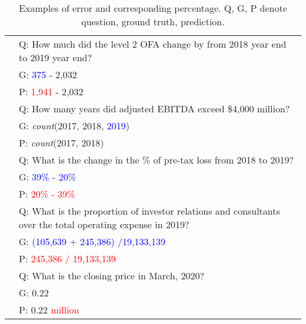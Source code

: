 \begin{table}[h]
\centering
\footnotesize
\begin{tabular}{L{1.6cm}|L{5.2cm}}
\toprule
{} & Q: How much did the level 2 OFA change by from 2018 year end to 2019 year end? \\
& G: \textcolor{blue}{375} - 2,032 \\
& P: \textcolor{red}{1,941} - 2,032 \\
\midrule
{} &  Q: How many years did adjusted EBITDA exceed \$4,000 million? \\
& G: \emph{count}(2017, 2018, \textcolor{blue}{2019}) \\
& P: \emph{count}(2017, 2018) \\
\midrule
{}
& Q: What is the change in the \% of pre-tax loss from 2018 to 2019? \\
& G: \textcolor{blue}{39\% - 20\%} \\
& P: \textcolor{red}{20\% - 39\%} \\
\midrule
{} & Q: What is the proportion of investor relations and consultants over the total operating expense in 2019? \\
& G: \textcolor{blue}{(105,639 + 245,386) /19,133,139} \\
& P: \textcolor{red}{245,386 / 19,133,139} \\
\midrule

 & Q: What is the closing price in March, 2020? \\
& G: 0.22 \\
& P: 0.22 \textcolor{red}{million} \\
\bottomrule
\end{tabular} 
\caption{Examples of error and corresponding percentage. 
Q, G, P denote question, ground truth, prediction.}
\label{tab:error-case} 
\end{table}



